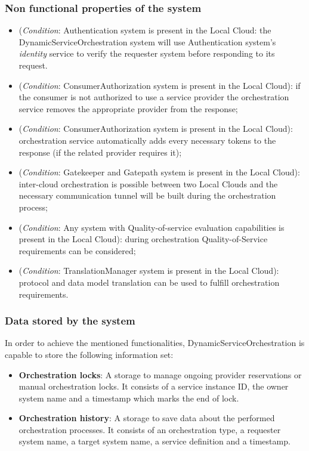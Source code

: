 \documentclass[a4paper]{arrowhead}
\begin{document}
\subsubsection {Non functional properties of the system}

\begin{itemize}
    \item (\textit{Condition}: Authentication system is present in the Local Cloud: the DynamicServiceOrchestration system will use Authentication system's \textit{identity} service to verify the requester system before responding to its request.
    \item (\textit{Condition}: ConsumerAuthorization system is present in the Local Cloud): if the consumer is not authorized to use a service provider the orchestration service removes the appropriate provider from the response;
    \item (\textit{Condition}: ConsumerAuthorization system is present in the Local Cloud): orchestration service automatically adds every necessary tokens to the response (if the related provider requires it);
    \item (\textit{Condition}: Gatekeeper and Gatepath system is present in the Local Cloud): inter-cloud orchestration is possible between two Local Clouds and the necessary communication tunnel will be built during the orchestration process;
    \item (\textit{Condition}: Any system with Quality-of-service evaluation capabilities is present in the Local Cloud): during orchestration Quality-of-Service requirements can be considered;
    \item (\textit{Condition}: TranslationManager system is present in the Local Cloud): protocol and data model translation can be used to fulfill orchestration requirements.
\end{itemize}

\subsubsection {Data stored by the system}
In order to achieve the mentioned functionalities, DynamicServiceOrchestration is capable to store the following information set:

\begin{itemize}
    \item \textbf{Orchestration locks}: A storage to manage ongoing provider reservations or manual orchestration locks. It consists of a service instance ID, the owner system name and a timestamp which marks the end of lock.
    \item \textbf{Orchestration history}: A storage to save data about the performed orchestration processes. It consists of an orchestration type, a requester system name, a target system name, a service definition and a timestamp.
\end{itemize}
\end{document}
